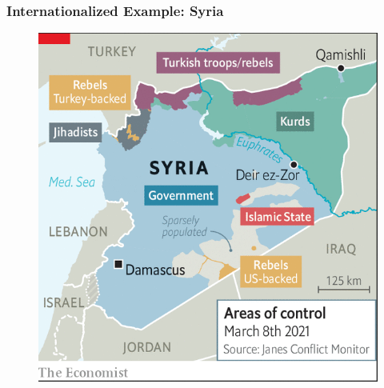 \documentclass[handout]{beamer}
\begin{document}
\begin{frame} 
	\frametitle{\LARGE{Internationalized Example: Syria}}
	\begin{figure}[ht!]
		\centering
		\includegraphics[width=\textwidth,height=0.9\textheight,keepaspectratio]{Syria2021.png}
	\end{figure}
\end{frame}
\end{document}
